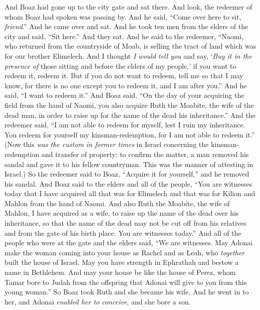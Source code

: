 \begin{biblechapter} %
 And Boaz had gone up to the city gate and sat there. And look, the redeemer of whom Boaz had spoken was passing by. And he said, “Come over here to sit, \textit{friend}.” And he came over and sat.
\verse And he took ten men from the elders of the city and said, “Sit here.” And they sat.
\verse And he said to the redeemer, “Naomi, who returned from the countryside of Moab, is selling the tract of land which was for our brother Elimelech.
\verse And I thought \textit{I would tell you} and say, ‘\textit{Buy it in the presence of} those sitting and before the elders of my people,’ if you want to redeem it, redeem it. But if you do not want to redeem, tell me so that I may know, for there is no one except you to redeem it, and I am after you.” And he said, “I want to redeem it.”
\verse And Boaz said, “On the day of your acquiring the field from the hand of Naomi, you also acquire Ruth the Moabite, the wife of the dead man, in order to raise up for the name of the dead his inheritance.”
\verse And the redeemer said, “I am not able to redeem for myself, lest I ruin my inheritance. You redeem for yourself my kinsman-redemption, for I am not able to redeem it.”
\verse (Now this \textit{was the custom in former times} in Israel concerning the kinsman-redemption and transfer of property: to confirm the matter, a man removed his sandal and gave it to his fellow countryman. This was the manner of attesting in Israel.)
\verse So the redeemer said to Boaz, “Acquire it for yourself,” and he removed his sandal.
\verse And Boaz said to the elders and all of the people, “You are witnesses today that I have acquired all that was for Elimelech and that was for Kilion and Mahlon from the hand of Naomi.
\verse And also Ruth the Moabite, the wife of Mahlon, I have acquired as a wife, to raise up the name of the dead over his inheritance, so that the name of the dead may not be cut off from his relatives and from the gate of his birth place. You are witnesses today.”
\verse And all of the people who were at the gate and the elders said, “We are witnesses. May Adonai make the woman coming into your house as Rachel and as Leah, who \textit{together} built the house of Israel. May you have strength in Ephrathah and bestow a name in Bethlehem.
\verse And may your house be like the house of Perez, whom Tamar bore to Judah from the offspring that Adonai will give to you from this young woman.”
 So Boaz took Ruth and she became his wife. And he went in to her, and Adonai \textit{enabled her to conceive}, and she bore a son.

\end{biblechapter}
